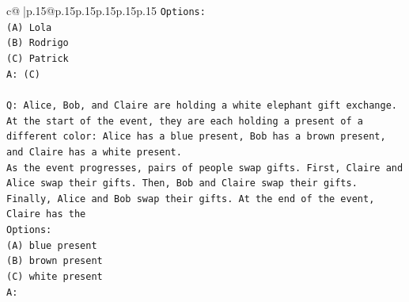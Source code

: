 \documentclass{article}
\begin{document}
{\begin{supertabular}{c@{$\;$}|p{.15\linewidth}@{}p{.15\linewidth}p{.15\linewidth}p{.15\linewidth}p{.15\linewidth}p{.15\linewidth}}
{{{\texttt{Options:} \\
\texttt{(A) Lola} \\
\texttt{(B) Rodrigo} \\
\texttt{(C) Patrick} \\
\texttt{A: (C)} \\
\\ 
\texttt{Q: Alice, Bob, and Claire are holding a white elephant gift exchange. At the start of the event, they are each holding a present of a different color: Alice has a blue present, Bob has a brown present, and Claire has a white present.} \\
\texttt{As the event progresses, pairs of people swap gifts. First, Claire and Alice swap their gifts. Then, Bob and Claire swap their gifts. Finally, Alice and Bob swap their gifts. At the end of the event, Claire has the} \\
\texttt{Options:} \\
\texttt{(A) blue present} \\
\texttt{(B) brown present} \\
\texttt{(C) white present} \\
\texttt{A:} \\
            }
        }
    }
     \\ \\


\end{supertabular}}
\end{document}
